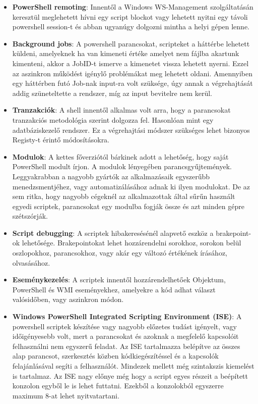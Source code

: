 \documentclass[12pt,oneside,justify,table]{book}
\begin{document}
\begin{itemize}
	\item \textbf{PowerShell remoting}: Innentől a Windows WS-Management szolgáltatásán keresztül meglehetett hívni egy script blockot vagy lehetett nyitni egy távoli powershell session-t és abban ugyanúgy dolgozni mintha a helyi gépen lenne.
	\item \textbf{Background jobs}: A powershell parancsokat, scripteket a háttérbe lehetett küldeni, amelyeknek ha van kimeneti értéke amelyet nem fájlba akartunk kimenteni, akkor a JobID-t ismerve a kimenetet vissza lehetett nyerni. Ezzel az aszinkron működést igénylő problémákat meg lehetett oldani. Amennyiben egy háttérben futó Job-nak input-ra volt szüksége, úgy annak a végrehajtását addig szüneteltette a rendszer, míg az input bevitelre nem kerül.
	\item \textbf{Tranzakciók}: A shell innentől alkalmas volt arra, hogy a parancsokat tranzakciós metodológia szerint dolgozza fel. Hasonlóan mint egy adatbáziskezelő rendszer. Ez a végrehajtási módszer szükséges lehet bizonyos Registy-t érintő módosításokra.
	\item \textbf{Modulok}: A kettes főverziótól bárkinek adott a lehetőség, hogy saját PowerShell modult írjon. A modulok lényegében parancsgyűjtemények. Leggyakrabban a nagyobb gyártók az alkalmazásaik egyszerűbb menedzsmentjéhez, vagy automatizálásához adnak ki ilyen modulokat. De az sem ritka, hogy nagyobb cégeknél az alkalmazottak által sűrűn használt egyedi scriptek, parancsokat egy modulba fogják össze és azt minden gépre szétszórják.
	\item \textbf{Script debugging}: A scriptek hibakeresésénél alapvető eszköz a brakepoint-ok lehetősége. Brakepointokat lehet hozzárendelni sorokhoz, sorokon belül oszlopokhoz, parancsokhoz, vagy akár egy változó értékének írásához, olvasásához.
	\item \textbf{Eseménykezelés}: A scriptek innentől hozzárendelhetőek Objektum, PowerShell és WMI eseményekhez, amelyekre a kód adhat választ valósidőben, vagy aszinkron módon.
	\item \textbf{Windows PowerShell Integrated Scripting Environment (ISE)}: A powershell scriptek készítése vagy nagyobb előzetes tudást igényelt, vagy időigényesebb volt, mert a parancsokat és azoknak a megfelelő kapcsolóit felhasználni nem egyszerű feladat. Az ISE tartalmazza belépítve az összes alap parancsot, szerkesztés közben kódkiegészítéssel és a kapcsolók felajánlásával segíti a felhasználót. Mindezek mellett még szintakszis kiemelést is tartalmaz. Az ISE nagy előnye még hogy a script egyes részeit a beépített konzolon egyből le is lehet futtatni. Ezekből a konzolokból egyszerre maximum 8-at lehet nyitvatartani. 

\end{itemize}
\end{document}
